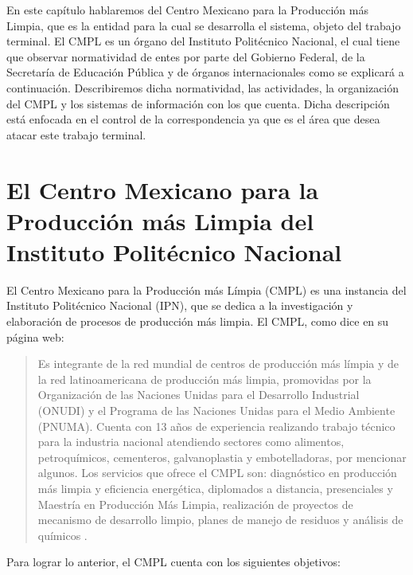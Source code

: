 En este capítulo hablaremos del Centro Mexicano para la Producción más Limpia, que es la entidad para la cual se desarrolla el sistema, objeto del trabajo terminal. El CMPL es un órgano del Instituto Politécnico Nacional, el cual tiene que observar normatividad de entes por parte del Gobierno Federal, de la Secretaría de Educación Pública y de órganos internacionales como se explicará a continuación. Describiremos dicha normatividad, las actividades, la organización del CMPL y los sistemas de información con los que cuenta. Dicha descripción está enfocada en el control de la correspondencia ya que es el área que desea atacar este trabajo terminal.

\section{El Centro Mexicano para la Producción más Limpia del Instituto Politécnico Nacional}

	El Centro Mexicano para la Producción más Límpia (CMPL) es una instancia del Instituto Politécnico Nacional (IPN), que se dedica a la investigación y elaboración de procesos de producción más limpia. El CMPL, como dice en su página web:

	\begin{quotation}Es integrante de la red mundial de centros de producción más límpia y de la red latinoamericana de producción más limpia, promovidas por la Organización de las Naciones Unidas para el Desarrollo Industrial (ONUDI) y el Programa de las Naciones Unidas para el Medio Ambiente (PNUMA). Cuenta con 13 años de experiencia realizando trabajo técnico para la industria nacional atendiendo sectores como alimentos, petroquímicos, cementeros, galvanoplastia y embotelladoras, por mencionar algunos. Los servicios que ofrece el CMPL son: diagnóstico en producción más limpia y eficiencia energética, diplomados a distancia, presenciales y Maestría en Producción Más Limpia, realización de proyectos de mecanismo de desarrollo limpio, planes de manejo de residuos y análisis de químicos \cite{CMPLWebPage}.
	\end{quotation}
	
	Para lograr lo anterior, el CMPL cuenta con los siguientes objetivos:
	
